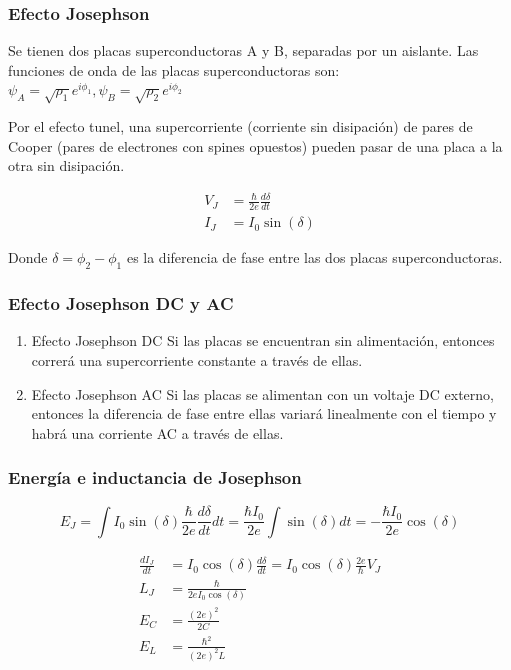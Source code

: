 \documentclass[xetex,mathserif,serif]{beamer}
\begin{document}
\begin{frame}
    \frametitle{Efecto Josephson}

    \justify
    Se tienen dos placas superconductoras A y B, separadas por un aislante. Las funciones de onda de las placas superconductoras son:
    $\psi_A = \sqrt{\rho_1} e^{i \phi_1}, \psi_B = \sqrt{\rho_2} e^{i \phi_2}$ 

    \justify
    Por el efecto tunel, una supercorriente (corriente sin disipación) de pares de Cooper (pares de electrones con spines opuestos) pueden pasar de una placa a la otra sin disipación.

    \begin{align}
        V_J &= \frac{\hbar}{2e} \frac{d\delta}{dt} \\
        I_J &= I_0 \sin(\delta)
    \end{align}

    \justify
    Donde $\delta=\phi_2-\phi_1$ es la diferencia de fase entre las dos placas superconductoras.

\end{frame}

\begin{frame}
    \frametitle{Efecto Josephson DC y AC}

    \begin{enumerate}
        \item Efecto Josephson DC
            Si las placas se encuentran sin alimentación, entonces correrá una supercorriente constante a través de ellas.

        \item Efecto Josephson AC
            Si las placas se alimentan con un voltaje DC externo, entonces la diferencia de fase entre ellas variará linealmente con el tiempo y habrá una corriente AC
a través de ellas.
    \end{enumerate}

\end{frame}

\begin{frame}
    \frametitle{Energía e inductancia de Josephson}

    \begin{equation}
        E_J = \int I_0 \sin(\delta) \frac{\hbar}{2e} \frac{d\delta}{dt} dt
         = \frac{\hbar I_0}{2e} \int \sin(\delta) dt
         = - \frac{\hbar I_0}{2e} \cos(\delta)
     \end{equation}

     \begin{align}
         \frac{dI_J}{dt} &= I_0 \cos(\delta) \frac{d \delta}{dt} = I_0 \cos(\delta)
          \frac{2e}{\hbar} V_J \\
         L_J &= \frac{\hbar}{2e I_0 \cos(\delta)} \\
         E_C &= \frac{(2e)^2}{2C} \\
         E_L &= \frac{\hbar^2}{(2e)^2L}
     \end{align}

\end{frame}
\end{document}
